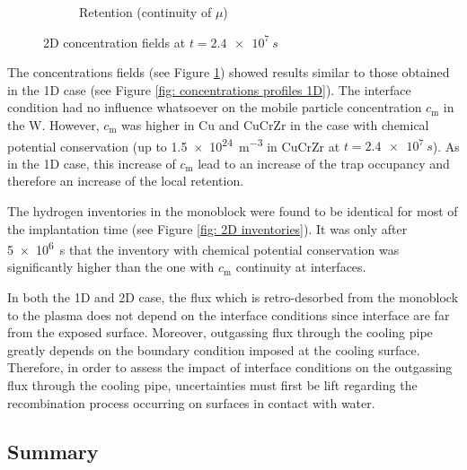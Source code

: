 \begin{figure}
\begin{subfigure}{0.5\linewidth}
        \caption{Retention (continuity of $\mu$)}
    \end{subfigure}
    \caption{2D concentration fields at $t=\SI{2.4e7}{s}$}
    \label{fig: concentrations fields 2d}
\end{figure}

The concentrations fields (see Figure \ref{fig: concentrations fields 2d}) showed results similar to those obtained in the 1D case (see Figure \ref{fig: concentrations profiles 1D}).
The interface condition had no influence whatsoever on the mobile particle concentration $c_\mathrm{m}$ in the W.
However, $c_\mathrm{m}$ was higher in Cu and CuCrZr in the case with chemical potential conservation (up to \SI{1.5e24}{m^{-3}} in CuCrZr at $t=\SI{2.4e7}{s}$).
As in the 1D case, this increase of $c_\mathrm{m}$ lead to an increase of the trap occupancy and therefore an increase of the local retention.

The hydrogen inventories in the monoblock were found to be identical for most of the implantation time (see Figure \ref{fig: 2D inventories}).
It was only after \SI{5e6}{s} that the inventory with chemical potential conservation was significantly higher than the one with $c_\mathrm{m}$ continuity at interfaces.

In both the 1D and 2D case, the flux which is retro-desorbed from the monoblock to the plasma does not depend on the interface conditions since interface are far from the exposed surface.
Moreover, outgassing flux through the cooling pipe greatly depends on the boundary condition imposed at the cooling surface.
Therefore, in order to assess the impact of interface conditions on the outgassing flux through the cooling pipe, uncertainties must first be lift regarding the recombination process occurring on surfaces in contact with water.

\subsection{Summary}
